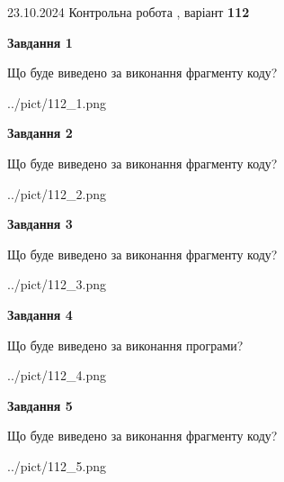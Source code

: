 \documentclass[12pt, ukrainian]{article}
\begin{document}
{\Large{23.10.2024 Контрольна робота , варіант  \No \textbf { 112 }\par}}
{
\begin {large}
{\begin {center}\textbf{Завдання 1}\end {center}}

Що буде виведено за виконання фрагменту коду?\par
\begin{center}
	{../pict/112_1.png}
\end{center}
\newpage

{\begin {center}\textbf{Завдання 2}\end {center}}

Що буде виведено за виконання фрагменту коду?\par
\begin{center}
	{../pict/112_2.png}
\end{center}
\newpage

{\begin {center}\textbf{Завдання 3}\end {center}}

Що буде виведено за виконання фрагменту коду?\par
\begin{center}
	{../pict/112_3.png}
\end{center}
\newpage

{\begin {center}\textbf{Завдання 4}\end {center}}

Що буде виведено за виконання програми?\par
\begin{center}
	{../pict/112_4.png}
\end{center}
\newpage

{\begin {center}\textbf{Завдання 5}\end {center}}

Що буде виведено за виконання фрагменту коду?\par
\begin{center}
	{../pict/112_5.png}
\end{center}
\newpage


\end{large}}
\end{document}
